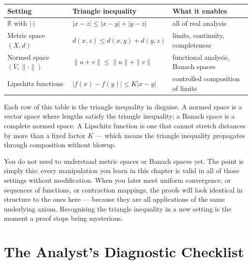 \begin{tcolorbox}[colback=gray!6, colframe=gray!40, arc=2pt,
  left=8pt, right=8pt, top=6pt, bottom=6pt,
  title={\small\textbf{The Triangle Inequality Across Mathematics}},
  fonttitle=\small\bfseries]
\small
\renewcommand{\arraystretch}{1.45}
\begin{tabular}{l l l}
\toprule
\textbf{Setting} & \textbf{Triangle inequality} & \textbf{What it enables} \\
\midrule
$\mathbb{R}$ with $|\cdot|$
  & $|x - z| \le |x - y| + |y - z|$
  & all of real analysis \\
Metric space $(X, d)$
  & $d(x,z) \le d(x,y) + d(y,z)$
  & limits, continuity, completeness \\
Normed space $(V, \|\cdot\|)$
  & $\|u + v\| \le \|u\| + \|v\|$
  & functional analysis, Banach spaces \\
Lipschitz functions
  & $|f(x)-f(y)| \le K|x-y|$
  & controlled composition of limits \\
\bottomrule
\end{tabular}
\end{tcolorbox}

\medskip

Each row of this table is the triangle inequality in disguise.
A normed space is a vector space where lengths satisfy the triangle
inequality; a Banach space is a complete normed space.
A Lipschitz function is one that cannot stretch distances by more
than a fixed factor $K$ — which means the triangle inequality
propagates through composition without blowup.

\begin{remark*}
You do not need to understand metric spaces or Banach spaces yet.
The point is simply this: every manipulation you learn in this chapter
is valid in all of those settings without modification.
When you later meet uniform convergence, or sequences of functions,
or contraction mappings, the proofs will look identical in structure
to the ones here — because they are all applications of the same
underlying axiom.
Recognising the triangle inequality in a new setting is the moment
a proof stops being mysterious.
\end{remark*}

\clearpage


\section{The Analyst's Diagnostic Checklist}
\label{sec:analyst-checklist}


